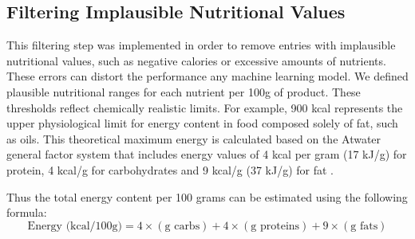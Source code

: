 \subsection{Filtering Implausible Nutritional Values}
This filtering step was implemented in order to remove entries with implausible nutritional values, such as negative calories or excessive amounts of nutrients. These errors can distort  the performance any machine learning model. We defined plausible nutritional ranges for each nutrient per 100g of product. These thresholds reflect chemically realistic limits. 
For example,  900 kcal represents the upper physiological limit for energy content in food composed solely of fat, such as oils. This theoretical maximum energy is calculated based on the Atwater general factor system that includes energy values of 4 kcal per gram (17 kJ/g) for protein, 4 kcal/g for carbohydrates and 9 kcal/g (37 kJ/g) for fat \cite{huelEnergyCalculation}.

Thus the total energy content per 100 grams can be estimated using the following formula:
$$
\text{Energy (kcal/100g)} = 4 \times (\text{g carbs}) + 4 \times (\text{g proteins}) + 9 \times (\text{g fats})
$$

